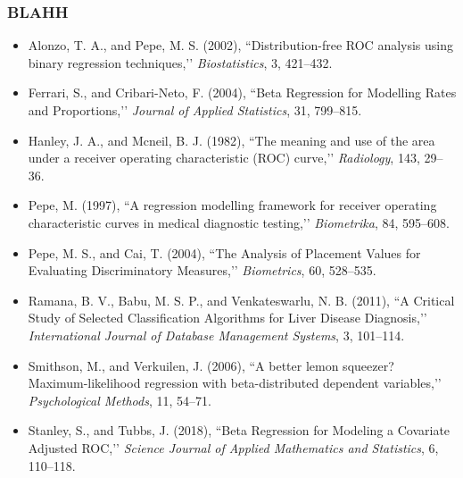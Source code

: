 \documentclass[t]{beamer}
\begin{document}
\begin{frame}
	\frametitle{BLAHH}
	\begin{footnotesize}
	\begin{itemize}
		\item Alonzo, T. A., and Pepe, M. S. (2002), ``Distribution-free ROC analysis using binary regression techniques,’’ \textit{Biostatistics}, 3, 421–432.
		\item Ferrari, S., and Cribari-Neto, F. (2004), ``Beta Regression for Modelling Rates and Proportions,’’ \textit{Journal of Applied Statistics}, 31, 799–815.
		\item Hanley, J. A., and Mcneil, B. J. (1982), ``The meaning and use of the area under a receiver operating characteristic (ROC) curve,’’ \textit{Radiology}, 143, 29–36.
		\item Pepe, M. (1997), ``A regression modelling framework for receiver operating characteristic curves in medical diagnostic testing,’’ \textit{Biometrika}, 84, 595–608.
		\item Pepe, M. S., and Cai, T. (2004), ``The Analysis of Placement Values for Evaluating Discriminatory Measures,’’ \textit{Biometrics}, 60, 528–535. 
		\item Ramana, B. V., Babu, M. S. P., and Venkateswarlu, N. B. (2011),  ``A Critical Study of Selected Classification Algorithms for Liver Disease Diagnosis,’’ \textit{International Journal of Database Management Systems}, 3, 101–114.
		\item Smithson, M., and Verkuilen, J. (2006), ``A better lemon squeezer? Maximum-likelihood regression with beta-distributed dependent variables,’’ \textit{Psychological Methods}, 11, 54–71.
		\item Stanley, S., and Tubbs, J. (2018), ``Beta Regression for Modeling a Covariate Adjusted ROC,’’ \textit{Science Journal of Applied Mathematics and Statistics}, 6, 110–118.
	\end{itemize}
	\end{footnotesize}
\end{frame}
\end{document}
